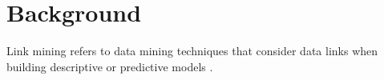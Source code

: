 \section{Background}
\label{sec:background}

Link mining refers to data mining techniques that consider data links when building descriptive or predictive models \cite{getoor2005link}.